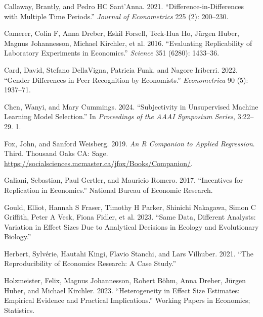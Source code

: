 \documentclass[
  letterpaper,
  DIV=11,
  numbers=noendperiod]{scrartcl}
\newlength{\cslhangindent}
\newlength{\cslentryspacingunit} %
\newenvironment{CSLReferences}[2] %
 {%
  \setlength{\parindent}{0pt}
  \ifodd #1
  \let\oldpar\par
  \def\par{\hangindent=\cslhangindent\oldpar}
  \fi
  \setlength{\parskip}{#2\cslentryspacingunit}
 }%
 {}
\begin{document}
\begin{CSLReferences}{1}{0}
\leavevmode{}%
Callaway, Brantly, and Pedro HC Sant'Anna. 2021.
{``Difference-in-Differences with Multiple Time Periods.''}
\emph{Journal of Econometrics} 225 (2): 200--230.

\leavevmode{}%
Camerer, Colin F, Anna Dreber, Eskil Forsell, Teck-Hua Ho, Jürgen Huber,
Magnus Johannesson, Michael Kirchler, et al. 2016. {``Evaluating
Replicability of Laboratory Experiments in Economics.''} \emph{Science}
351 (6280): 1433--36.

\leavevmode{}%
Card, David, Stefano DellaVigna, Patricia Funk, and Nagore Iriberri.
2022. {``Gender Differences in Peer Recognition by Economists.''}
\emph{Econometrica} 90 (5): 1937--71.

\leavevmode{}%
Chen, Wanyi, and Mary Cummings. 2024. {``Subjectivity in Unsupervised
Machine Learning Model Selection.''} In \emph{Proceedings of the AAAI
Symposium Series}, 3:22--29. 1.

\leavevmode{}%
Fox, John, and Sanford Weisberg. 2019. \emph{An {R} Companion to Applied
Regression}. Third. Thousand Oaks {CA}: Sage.
\url{https://socialsciences.mcmaster.ca/jfox/Books/Companion/}.

\leavevmode{}%
Galiani, Sebastian, Paul Gertler, and Mauricio Romero. 2017.
{``Incentives for Replication in Economics.''} National Bureau of
Economic Research.

\leavevmode{}%
Gould, Elliot, Hannah S Fraser, Timothy H Parker, Shinichi Nakagawa,
Simon C Griffith, Peter A Vesk, Fiona Fidler, et al. 2023. {``Same Data,
Different Analysts: Variation in Effect Sizes Due to Analytical
Decisions in Ecology and Evolutionary Biology.''}

\leavevmode{}%
Herbert, Sylvérie, Hautahi Kingi, Flavio Stanchi, and Lars Vilhuber.
2021. {``The Reproducibility of Economics Research: A Case Study.''}

\leavevmode{}%
Holzmeister, Felix, Magnus Johannesson, Robert Böhm, Anna Dreber, Jürgen
Huber, and Michael Kirchler. 2023. {``Heterogeneity in Effect Size
Estimates: Empirical Evidence and Practical Implications.''} Working
Papers in Economics; Statistics.


\end{CSLReferences}
\end{document}
